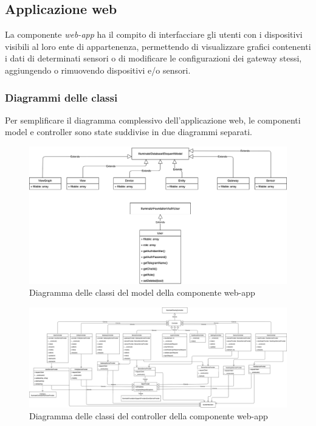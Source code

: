 \subsection{Applicazione web}
La componente \textit{web-app} ha il compito di interfacciare gli utenti con i dispositivi visibili al loro ente di appartenenza, permettendo di visualizzare grafici contenenti i dati di determinati sensori o di modificare le configurazioni dei gateway stessi, aggiungendo o rimuovendo dispositivi e/o sensori. 

	\subsubsection{Diagrammi delle classi}
	Per semplificare il diagramma complessivo dell'applicazione web, le componenti model e controller sono state suddivise in due diagrammi separati.
	\begin{landscape}
		\begin{figure}[H]
			\centering
			\includegraphics[scale=0.600]{res/images/WEBAPP/ModelWebApp.png}
			\caption{Diagramma delle classi del model della componente web-app}
		\end{figure}
		\begin{figure}[H]
			\centering
			\includegraphics[scale=0.300]{res/images/WEBAPP/ControllerWebApp.png}
			\caption{Diagramma delle classi del controller della componente web-app}
		\end{figure}
		\end{landscape}